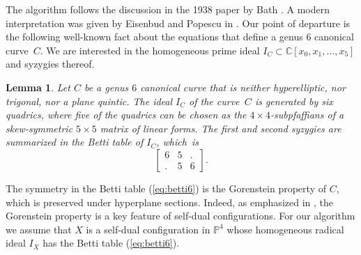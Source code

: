 \documentclass[12pt]{extarticle}
\newtheorem{lemma}[theorem]{Lemma}
\theoremstyle{definition}
\numberwithin{theorem}{section}
\theoremstyle{plain}\newtheorem{ithm}{Theorem}
\newcommand{\PP}{\mathbb{P}}
\newcommand{\CC}{\mathbb{C} }
\begin{document}
The algorithm follows the  discussion in the 1938 paper by  Bath \cite{Bath}.
A modern interpretation was given by Eisenbud and Popescu in
 \cite[Remark 9.1]{EP}.
Our point of departure is the following 
well-known fact about the equations that define a
genus $6$ canonical curve~$C$.
We are interested in the homogeneous prime ideal
$I_C \subset \CC[x_0,x_1,\ldots,x_5]$ and syzygies thereof.


\begin{lemma} \label{prop:skewsymm}
Let $C$ be a genus $6$ canonical curve that is neither hyperelliptic, nor trigonal, nor a plane quintic.
The ideal $I_C$ of  the curve $\,C$ is generated by six quadrics, where
five of the quadrics can be chosen as the $4 \times 4$-subpfaffians of a skew-symmetric
$5 \times 5$ matrix of linear forms. The first and second syzygies are summarized in the Betti table
of $I_C$, which~is
\begin{equation} \label{eq:betti6}
\begin{bmatrix} 6 & 5 & . \\ . & 5 & 6 \end{bmatrix}.
\end{equation}
\end{lemma}

The symmetry in the Betti table (\ref{eq:betti6}) is the
Gorenstein property of $C$, which is preserved
under hyperplane sections. Indeed, as emphasized in \cite{EP, EP2},
the Gorenstein property is a key feature of self-dual configurations.
For our algorithm we assume that $X$ is a self-dual configuration
in $\PP^4$ whose homogeneous radical ideal $I_X$ has the Betti table (\ref{eq:betti6}).
\end{document}
